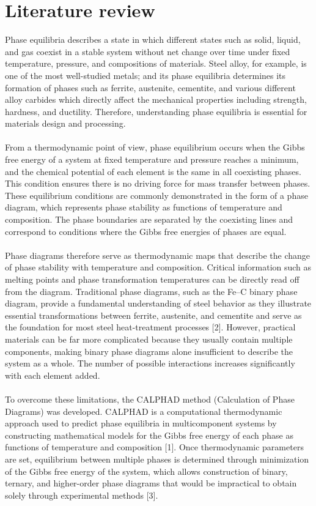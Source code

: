 \documentclass[11pt]{article}
\begin{document}
\section{Literature review}
\noindent Phase equilibria describes a state in which different states such as solid, liquid, and gas coexist in a stable system without net change over time under fixed temperature, pressure, and compositions of materials. Steel alloy, for example, is one of the most well-studied metals; and its phase equilibria determines its formation of phases such as ferrite, austenite, cementite, and various different alloy carbides which directly affect the mechanical properties including strength, hardness, and ductility. Therefore, understanding phase equilibria is essential for materials design and processing.
\\~\\
\noindent From a thermodynamic point of view, phase equilibrium occurs when the Gibbs free energy of a system at fixed temperature and pressure reaches a minimum, and the chemical potential of each element is the same in all coexisting phases. This condition ensures there is no driving force for mass transfer between phases. These equilibrium conditions are commonly demonstrated in the form of a phase diagram, which represents phase stability as functions of temperature and composition. The phase boundaries are separated by the coexisting lines and correspond to conditions where the Gibbs free energies of phases are equal.
\\~\\
\noindent Phase diagrams therefore serve as thermodynamic maps that describe the change of phase stability with temperature and composition. Critical information such as melting points and phase transformation temperatures can be directly read off from the diagram. Traditional phase diagrams, such as the Fe–C binary phase diagram, provide a fundamental understanding of steel behavior as they illustrate essential transformations between ferrite, austenite, and cementite and serve as the foundation for most steel heat-treatment processes [2]. However, practical materials can be far more complicated because they usually contain multiple components, making binary phase diagrams alone insufficient to describe the system as a whole. The number of possible interactions increases significantly with each element added.
\\~\\
\noindent To overcome these limitations, the CALPHAD method (Calculation of Phase Diagrams) was developed. CALPHAD is a computational thermodynamic approach used to predict phase equilibria in multicomponent systems by constructing mathematical models for the Gibbs free energy of each phase as functions of temperature and composition [1]. Once thermodynamic parameters are set, equilibrium between multiple phases is determined through minimization of the Gibbs free energy of the system, which allows construction of binary, ternary, and higher-order phase diagrams that would be impractical to obtain solely through experimental methods [3].
\end{document}
